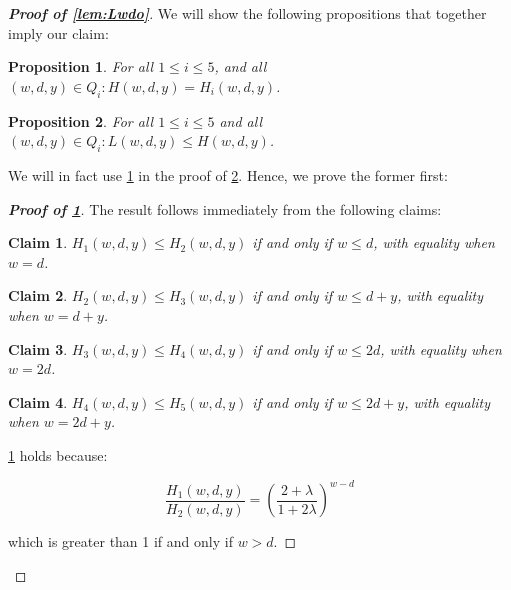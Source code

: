\documentclass[10pt,a4paper]{article}
\newtheorem{proposition}{Proposition}
\newtheorem{claim}{Claim}
\newcommand{\openinteger}{y}
\begin{document}
\begin{proof}[\textbf{Proof of \cref{lem:Lwdo}}]
 We will show the following propositions that together imply our claim:

\begin{proposition}
\label{prop:H}
For all $1\le i\le 5$, and all $(w, d, \openinteger)\in Q_i: H(w, d, \openinteger) = H_i(w, d, \openinteger)$.
\end{proposition}


\begin{proposition}
\label{prop:L-sol-open}
For all $1\le i\le 5$ and all $(w, d, \openinteger)\in Q_i: L(w, d, \openinteger) \le H(w, d, \openinteger)$.
\end{proposition}

We will in fact use \cref{prop:H} in the proof of \cref{prop:L-sol-open}. Hence, we prove the former first:


\begin{proof}[\textbf{Proof of \cref{prop:H}}]
The result follows immediately from the following claims:

\begin{claim}
\label{claim:H-sol-1}
$H_1(w, d, \openinteger) \leq H_2(w, d, \openinteger)$ if and only if $w \leq d$, with equality when $w = d$.
\end{claim}

\begin{claim}
\label{claim:H-sol-2}
$H_2(w, d, \openinteger) \leq H_3(w, d, \openinteger)$ if and only if $w \leq d + \openinteger$, with equality when $w = d + \openinteger$.
\end{claim}

\begin{claim}
\label{claim:H-sol-3}
$H_3(w, d, \openinteger) \leq H_4(w, d, \openinteger)$ if and only if $w \leq 2d$, with equality when $w = 2d$.
\end{claim}

\begin{claim}
\label{claim:H-sol-4}
$H_4(w, d, \openinteger) \leq H_5(w, d, \openinteger)$ if and only if $w \leq 2d+\openinteger$, with equality when $w = 2d+\openinteger$.
\end{claim}

\cref{claim:H-sol-1} holds because: 

\begin{equation*}
\frac{H_1(w, d, \openinteger)}{H_2(w, d, \openinteger)} = \left(\frac{2+\lambda}{1+2\lambda}\right)^{w-d}
\end{equation*}

which is greater than 1 if and only if $w > d$.


\end{proof}
\end{proof}
\end{document}
